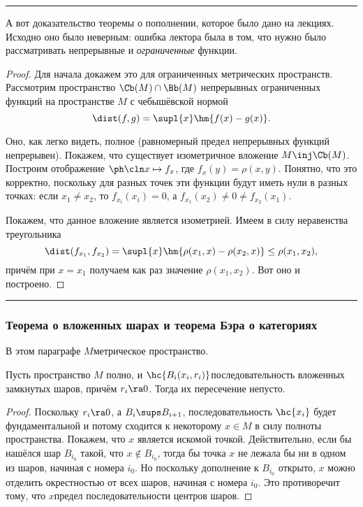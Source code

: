 \documentclass[a4paper]{article}
\newenvironment{petit}
{\par \smallskip \hrule \smallskip \footnotesize}
{\par \smallskip \hrule \smallskip}
\begin{document}
\begin{petit}
А вот доказательство теоремы о пополнении, которое было дано на лекциях. Исходно оно было неверным:
ошибка лектора была в том, что нужно было рассматривать непрерывные и \emph{ограниченные} функции.

\begin{proof}
Для начала докажем это для ограниченных метрических пространств.
Рассмотрим пространство $\Cb(M)\cap \Bb(M)$ непрерывных ограниченных функций на пространстве $M$
с чебышёвской нормой
$$\dist(f,g) = \supl{x} \hm{f(x) - g(x)}.$$

Оно, как легко видеть, полное (равномерный предел непрерывных функций непрерывен). Покажем, что
существует изометричное вложение $M \inj \Cb(M)$. Построим отображение $\ph\cln x \mapsto f_x$,
где $f_x(y) = \rho(x, y)$. Понятно, что это корректно,
поскольку для разных точек эти функции будут иметь нули в разных точках:
если $x_1 \neq x_2$, то $f_{x_i}(x_i) = 0$, а $f_{x_1}(x_2) \neq 0 \neq f_{x_2}(x_1)$.

Покажем, что данное вложение является изометрией. Имеем в силу неравенства треугольника
$$
  \dist(f_{x_1}, f_{x_2}) = \supl{x} \hm{\rho(x_1,x) - \rho(x_2,x)} \le \rho(x_1,x_2),
$$
причём при $x = x_1$ получаем как раз значение $\rho(x_1,x_2)$.
Вот оно и построено.
\end{proof}
\end{petit}

\subsubsection{Теорема о вложенных шарах и теорема Бэра о категориях}

В этом параграфе $M$\т метрическое пространство.

\begin{theorem}
Пусть пространство $M$ полно, и $\hc{B_i(x_i, r_i)}$\т последовательность вложенных
замкнутых шаров, причём $r_i \ra 0$. Тогда их пересечение непусто.
\end{theorem}
\begin{proof}
Поскольку $r_i \ra 0$, а $B_i \sups B_{i+1}$, последовательность $\hc{x_i}$ будет
фундаментальной и потому сходится
к некоторому $x \in M$ в силу полноты пространства. Покажем, что $x$ является искомой точкой.
Действительно, если бы нашёлся шар $B_{i_0}$ такой, что $x \notin B_{i_0}$, тогда бы
точка $x$ не лежала бы ни в одном из шаров, начиная с номера $i_0$. Но поскольку дополнение к $B_{i_0}$
открыто, $x$ можно отделить окрестностью от всех шаров, начиная с номера $i_0$. Это противоречит тому,
что $x$\т предел последовательности центров шаров.
\end{proof}
\end{document}
